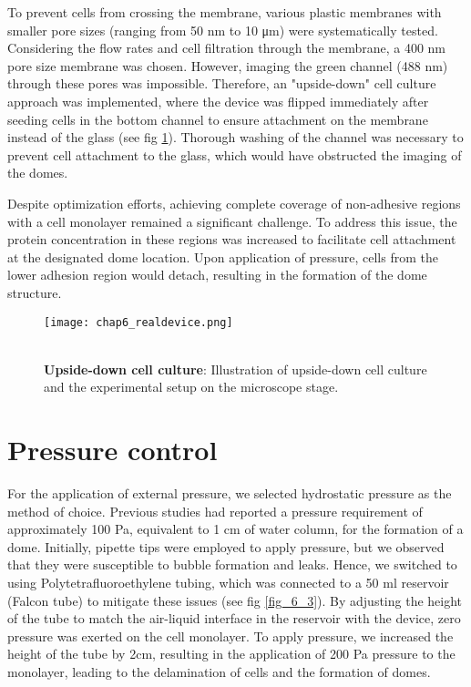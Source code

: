 \clearpage

To prevent cells from crossing the membrane, various plastic membranes with smaller pore sizes (ranging from 50 \unit{\nm} to 10 \unit{\um}) were systematically tested. Considering the flow rates and cell filtration through the membrane, a 400 \unit{\nm} pore size membrane was chosen. However, imaging the green channel (488 \unit{\nm}) through these pores was impossible. Therefore, an "upside-down" cell culture approach was implemented, where the device was flipped immediately after seeding cells in the bottom channel to ensure attachment on the membrane instead of the glass (see fig \ref{fig_6_5}). Thorough washing of the channel was necessary to prevent cell attachment to the glass, which would have obstructed the imaging of the domes.

Despite optimization efforts, achieving complete coverage of non-adhesive regions with a cell monolayer remained a significant challenge. To address this issue, the protein concentration in these regions was increased to facilitate cell attachment at the designated dome location. Upon application of pressure, cells from the lower adhesion region would detach, resulting in the formation of the dome structure.

\begin{figure}
	\begin{minipage}[c]{0.7\textwidth}
		\texttt{[image: chap6\_realdevice.png]}
	\end{minipage}\hfill
	\begin{minipage}[c]{0.27\textwidth}
		\caption{\\ \textbf{Upside-down cell culture}: Illustration of upside-down cell culture and the experimental setup on the microscope stage.
		}\label{fig_6_5}
	\end{minipage}
\end{figure}

\hypertarget{pressure-control}{%
\section{Pressure control}\label{pressure-control}}

For the application of external pressure, we selected hydrostatic pressure as the method of choice. Previous studies had reported a pressure requirement of approximately 100 \unit{\pascal}, equivalent to 1 \unit{\cm} of water column, for the formation of a dome. Initially, pipette tips were employed to apply pressure, but we observed that they were susceptible to bubble formation and leaks. Hence, we switched to using Polytetrafluoroethylene tubing, which was connected to a 50 \unit{\ml} reservoir (Falcon tube) to mitigate these issues (see fig \ref{fig_6_3}). By adjusting the height of the tube to match the air-liquid interface in the reservoir with the device, zero pressure was exerted on the cell monolayer. To apply pressure, we increased the height of the tube by 2\unit{\cm}, resulting in the application of 200 \unit{\pascal} pressure to the monolayer, leading to the delamination of cells and the formation of domes.

